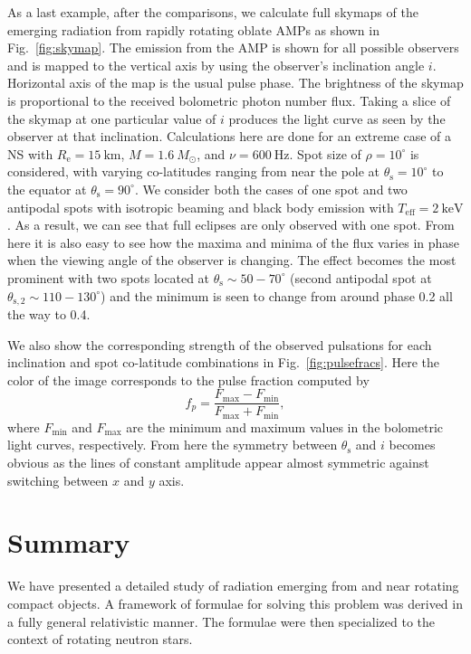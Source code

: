\documentclass{aa}
\newcommand{\be}{\begin{equation}}
\newcommand{\ee}{\end{equation}}
\newcommand{\Msun}{\ensuremath{M_{\odot}}}
\begin{document}
As a last example, after the comparisons, we calculate full skymaps of the emerging radiation from rapidly rotating oblate AMPs as shown in Fig.~\ref{fig:skymap}.
The emission from the AMP is shown for all possible observers and is mapped to the vertical axis by using the observer's inclination angle $i$.
Horizontal axis of the map is the usual pulse phase.
The brightness of the skymap is proportional to the received bolometric photon number flux.
Taking a slice of the skymap at one particular value of $i$ produces the light curve as seen by the observer at that inclination.
Calculations here are done for an extreme case of a NS with $R_{\mathrm{e}} = 15~\mathrm{km}$, $M=1.6~\Msun$, and $\nu = 600~\mathrm{Hz}$.
Spot size of $\rho = 10^{\circ}$ is considered, with varying co-latitudes ranging from near the pole at $\theta_{\mathrm{s}} = 10^{\circ}$ to the equator at $\theta_{\mathrm{s}} = 90^{\circ}$.
We consider both the cases of one spot and two antipodal spots with isotropic beaming and black body emission with $T_{\mathrm{eff}} = 2~\mathrm{keV}$.
As a result, we can see that full eclipses are only observed with one spot.
From here it is also easy to see how the maxima and minima of the flux varies in phase when the viewing angle of the observer is changing.
The effect becomes the most prominent with two spots located at $\theta_{\mathrm{s}} \sim 50-70^{\circ}$ (second antipodal spot at $\theta_{\mathrm{s,2}} \sim 110-130^{\circ}$) and the minimum is seen to change from around phase 0.2 all the way to 0.4.

We also show the corresponding strength of the observed pulsations for each inclination and spot co-latitude combinations in Fig.~\ref{fig:pulsefracs}.
Here the color of the image corresponds to the pulse fraction computed by
\be
f_p = \frac{F_{\mathrm{max}} - F_{\mathrm{min}}}{F_{\mathrm{max}} + F_{\mathrm{min}}},
\ee
where $F_{\mathrm{min}}$ and $F_{\mathrm{max}}$ are the minimum and maximum values in the bolometric light curves, respectively.
From here the symmetry between $\theta_{\mathrm{s}}$ and $i$ becomes obvious as the lines of constant amplitude appear almost symmetric against switching between $x$ and $y$ axis.




\section{Summary}\label{sect:summary}
We have presented a detailed study of radiation emerging from and near rotating compact objects.
A framework of formulae for solving this problem was derived in a fully general relativistic manner. 
The formulae were then specialized to the context of rotating neutron stars.
\end{document}
